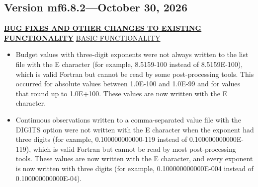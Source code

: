 \subsection{Version mf6.8.2---October 30, 2026}

\textbf{\underline{BUG FIXES AND OTHER CHANGES TO EXISTING FUNCTIONALITY}}
\underline{BASIC FUNCTIONALITY}
\begin{itemize}
\item Budget values with three-digit exponents were not always written to the list file with the E character (for example, 8.5159-100 instead of 8.5159E-100), which is valid Fortran but cannot be read by some post-processing tools. This occurred for absolute values between 1.0E-100 and 1.0E-99 and for values that round up to 1.0E+100. These values are now written with the E character.
\item Continuous observations written to a comma-separated value file with the DIGITS option were not written with the E character when the exponent had three digits (for example, 0.100000000000-119 instead of 0.100000000000E-119), which is valid Fortran but cannot be read by most post-processing tools. These values are now written with the E character, and every exponent is now written with three digits (for example, 0.100000000000E-004 instead of 0.100000000000E-04).
\end{itemize}

